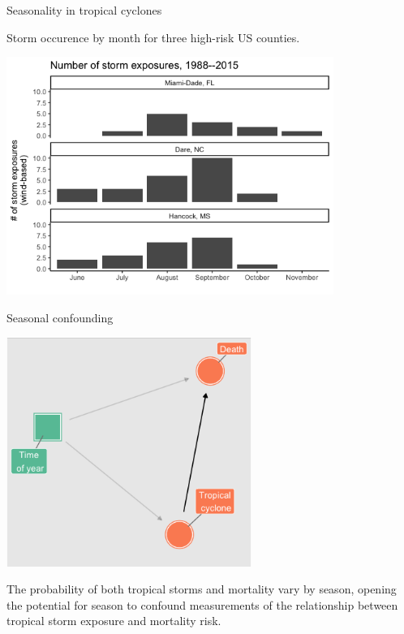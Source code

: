 \documentclass[ignorenonframetext,]{beamer}
\begin{document}
\begin{frame}{Seasonality in tropical cyclones}

Storm occurence by month for three high-risk US counties.

\begin{center}\includegraphics[width=0.8\textwidth]{figures/storm_seasonality} \end{center}

\end{frame}

\begin{frame}{Seasonal confounding}

\begin{center}\includegraphics[width=0.6\textwidth]{figures/seasonal_confounding} \end{center}

\small The probability of both tropical storms and mortality vary by
season, opening the potential for season to confound measurements of the
relationship between tropical storm exposure and mortality risk.

\end{frame}
\end{document}
